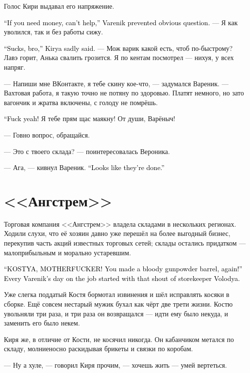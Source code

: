 \documentclass[a4paper,10pt,fleqn]{book}\usepackage{polyglossia}\setdefaultlanguage{english}\setotherlanguage{russian}\defaultfontfeatures{Ligatures=TeX,Mapping=tex-text} \usepackage{xcolor}\definecolor{lightgray}{HTML}{bbbbbb}\color{lightgray}\newcommand{\ml}[3]{\textcolor{black}{#3}}
\begin{document}
Голос Кири выдавал его напряжение.

\ml{$0$}
{--- Если ты хочешь занять, не могу помочь, --- предупредил Вареник очевидный вопрос.}
{``If you need money, can't help,'' Varenik prevented obvious question.}
--- Я как уволился, так и без работы сижу.

\ml{$0$}
{--- Бля, братан, --- опечалился Киря.}
{``Sucks, bro,'' Kirya sadly said.}
--- Мож варик какой есть, чтоб по-быстрому?
Лавэ горит, Анька свалить грозится.
Я по кентам посмотрел --- нихуя, у всех напряг.

--- Напиши мне ВКонтакте, я тебе скину кое-что, --- задумался Вареник.
--- Вахтовая работа, я такую точно не потяну по здоровью.
Платят немного, но зато вагончик и жратва включены, с голоду не помрёшь.

\ml{$0$}
{--- Заебись!}
{``Fuck yeah!}
Я тебе прям щас маякну!
От души, Варёныч!

--- Говно вопрос, обращайся.

--- Это с твоего склада? --- поинтересовалась Вероника.

--- Ага, --- кивнул Вареник.
\ml{$0$}
{--- Там походу всё.}
{``Looks like they're done.''}

\section{<<Ангстрем>>}

Торговая компания <<Ангстрем>> владела складами в нескольких регионах.
Ходили слухи, что её хозяин давно уже перешёл на более выгодный бизнес, перекупив часть акций известных торговых сетей;
склады остались придатком --- малоприбыльным и морально устаревшим.

\ml{$0$}
{--- КОООСТЯ, БЛЯЯЯ!}
{``KOSTYA, MOTHERFUCKER!}
\ml{$0$}
{Опять ты мне, сука, собрал бочку с порохом! --- с этого крика кладовщика Володи начинался рабочий день Вареника.}
{You made a bloody gunpowder barrel, again!'' Every Varenik's day on the job started with that shout of storekeeper Volodya.}

Уже слегка поддатый Костя бормотал извинения и шёл исправлять косяки в сборке.
Ещё совсем нестарый мужик бухал как чёрт две трети жизни.
Костю увольняли три раза, и три раза он возвращался --- идти ему было некуда, и заменить его было некем.

Киря же, в отличие от Кости, не косячил никогда.
Он кабанчиком метался по складу, молниеносно раскидывая брикеты и связки по коробам.

--- Ну а хуле, --- говорил Киря прочим, --- хочешь жить --- умей вертеться.
\end{document}
